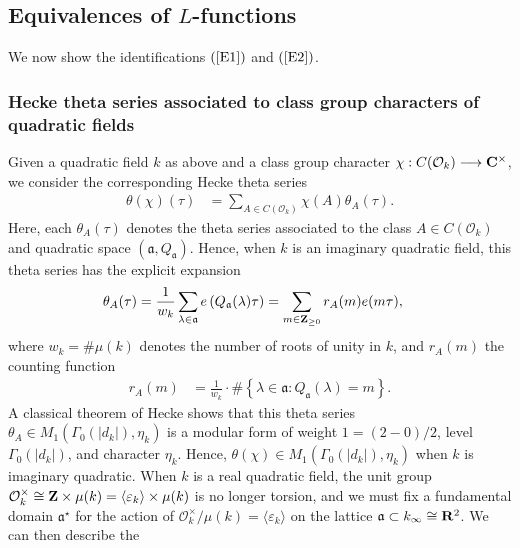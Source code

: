 \documentclass{amsart}
\theoremstyle{definition}
\theoremstyle{definition}
\theoremstyle{definition}
\begin{document}
\subsection{Equivalences of $L$-functions}

We now show the identifications $(\ref{E1})$ and $(\ref{E2})$.

\subsubsection{Hecke theta series associated to class group characters of quadratic fields}

Given a quadratic field $k$ as above and a class group character
$\chi : C(\mathcal{O}_k) \longrightarrow {\bf{C}}^{\times}$, we consider the corresponding Hecke theta series 
\begin{align*} \theta(\chi)(\tau) &= \sum\limits_{A \in C(\mathcal{O}_k)} \chi(A) \theta_A(\tau). \end{align*}
Here, each $\theta_A(\tau)$ denotes the theta series associated to the class 
$A \in C(\mathcal{O}_k)$ and quadratic space $(\mathfrak{a}, Q_{\mathfrak{a}})$.
Hence, when $k$ is an imaginary quadratic field, this theta series has the explicit expansion 
\begin{align*} \theta_A(\tau) &= \frac{1}{w_k}\sum\limits_{\lambda \in \mathfrak{a}} e \left( Q_{\mathfrak{a}}(\lambda) \tau \right)
= \sum\limits_{m \in {\bf{Z}}_{\geq 0}} r_A(m) e(m \tau), \end{align*}
where $w_k = \# \mu(k)$ denotes the number of roots of unity in $k$, and $r_A(m)$ the counting function 
\begin{align*} r_A(m) &= \frac{1}{w_k} \cdot \# \left \lbrace \lambda \in \mathfrak{a}: Q_{\mathfrak{a}}(\lambda) = m \right\rbrace. \end{align*}
A classical theorem of Hecke shows that this theta series $\theta_A \in M_1(\Gamma_0(\vert d_k \vert), \eta_k)$
is a modular form of weight $1 = (2-0)/2$, level $\Gamma_0(\vert d_k \vert)$, 
and character $\eta_k$. Hence, $\theta(\chi) \in M_1(\Gamma_0(\vert d_k \vert), \eta_k)$ when $k$ is imaginary quadratic. 
When $k$ is a real quadratic field, the unit group $\mathcal{O}_k^{\times} \cong {\bf{Z}} \times \mu(k) = \langle \varepsilon_k \rangle \times \mu(k)$ 
is no longer torsion, and we must fix a fundamental domain $\mathfrak{a}^{\star}$ for the action of 
$\mathcal{O}_k^{\times}/ \mu(k) = \langle \varepsilon_k \rangle$ on the lattice 
$\mathfrak{a} \subset k_{\infty} \cong {\bf{R}}^2$. We can then describe the 
\end{document}
